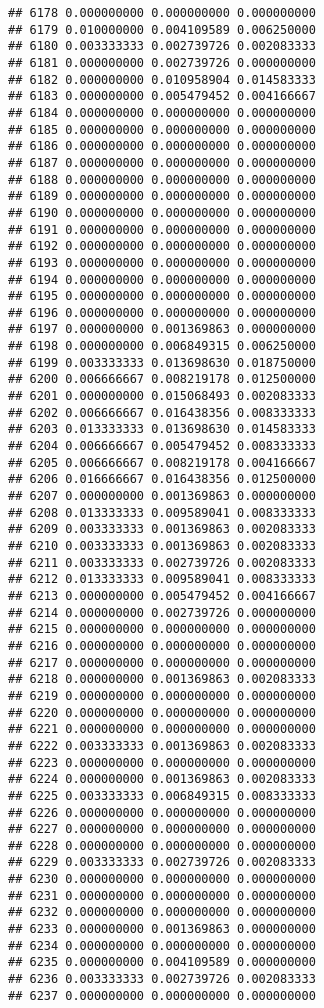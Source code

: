 \documentclass[
]{article}
\begin{document}
\begin{verbatim}
## 6178 0.000000000 0.000000000 0.000000000
## 6179 0.010000000 0.004109589 0.006250000
## 6180 0.003333333 0.002739726 0.002083333
## 6181 0.000000000 0.002739726 0.000000000
## 6182 0.000000000 0.010958904 0.014583333
## 6183 0.000000000 0.005479452 0.004166667
## 6184 0.000000000 0.000000000 0.000000000
## 6185 0.000000000 0.000000000 0.000000000
## 6186 0.000000000 0.000000000 0.000000000
## 6187 0.000000000 0.000000000 0.000000000
## 6188 0.000000000 0.000000000 0.000000000
## 6189 0.000000000 0.000000000 0.000000000
## 6190 0.000000000 0.000000000 0.000000000
## 6191 0.000000000 0.000000000 0.000000000
## 6192 0.000000000 0.000000000 0.000000000
## 6193 0.000000000 0.000000000 0.000000000
## 6194 0.000000000 0.000000000 0.000000000
## 6195 0.000000000 0.000000000 0.000000000
## 6196 0.000000000 0.000000000 0.000000000
## 6197 0.000000000 0.001369863 0.000000000
## 6198 0.000000000 0.006849315 0.006250000
## 6199 0.003333333 0.013698630 0.018750000
## 6200 0.006666667 0.008219178 0.012500000
## 6201 0.000000000 0.015068493 0.002083333
## 6202 0.006666667 0.016438356 0.008333333
## 6203 0.013333333 0.013698630 0.014583333
## 6204 0.006666667 0.005479452 0.008333333
## 6205 0.006666667 0.008219178 0.004166667
## 6206 0.016666667 0.016438356 0.012500000
## 6207 0.000000000 0.001369863 0.000000000
## 6208 0.013333333 0.009589041 0.008333333
## 6209 0.003333333 0.001369863 0.002083333
## 6210 0.003333333 0.001369863 0.002083333
## 6211 0.003333333 0.002739726 0.002083333
## 6212 0.013333333 0.009589041 0.008333333
## 6213 0.000000000 0.005479452 0.004166667
## 6214 0.000000000 0.002739726 0.000000000
## 6215 0.000000000 0.000000000 0.000000000
## 6216 0.000000000 0.000000000 0.000000000
## 6217 0.000000000 0.000000000 0.000000000
## 6218 0.000000000 0.001369863 0.002083333
## 6219 0.000000000 0.000000000 0.000000000
## 6220 0.000000000 0.000000000 0.000000000
## 6221 0.000000000 0.000000000 0.000000000
## 6222 0.003333333 0.001369863 0.002083333
## 6223 0.000000000 0.000000000 0.000000000
## 6224 0.000000000 0.001369863 0.002083333
## 6225 0.003333333 0.006849315 0.008333333
## 6226 0.000000000 0.000000000 0.000000000
## 6227 0.000000000 0.000000000 0.000000000
## 6228 0.000000000 0.000000000 0.000000000
## 6229 0.003333333 0.002739726 0.002083333
## 6230 0.000000000 0.000000000 0.000000000
## 6231 0.000000000 0.000000000 0.000000000
## 6232 0.000000000 0.000000000 0.000000000
## 6233 0.000000000 0.001369863 0.000000000
## 6234 0.000000000 0.000000000 0.000000000
## 6235 0.000000000 0.004109589 0.000000000
## 6236 0.003333333 0.002739726 0.002083333
## 6237 0.000000000 0.000000000 0.000000000

\end{verbatim}
\end{document}

